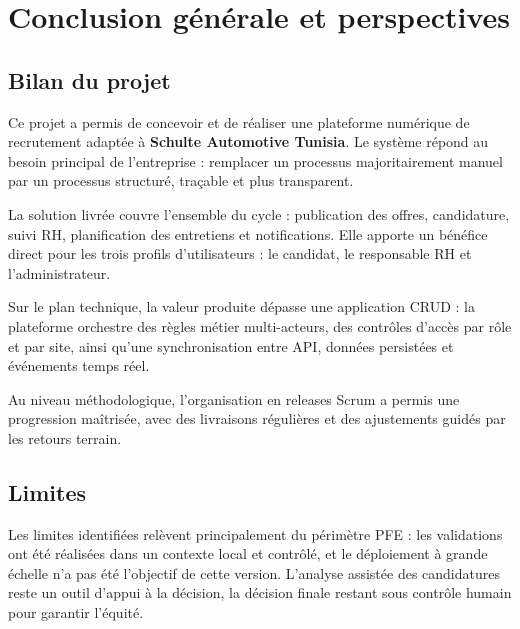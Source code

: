 
\chapter*{Conclusion générale et perspectives}

\section*{Bilan du projet}

Ce projet a permis de concevoir et de réaliser une plateforme numérique de
recrutement adaptée à \textbf{Schulte Automotive Tunisia}. Le système
répond au besoin principal de l'entreprise : remplacer un processus
majoritairement manuel par un processus structuré, traçable et plus
transparent.

La solution livrée couvre l'ensemble du cycle : publication des offres,
candidature, suivi RH, planification des entretiens et notifications.
Elle apporte un bénéfice direct pour les trois profils d'utilisateurs :
le candidat, le responsable RH et l'administrateur.

Sur le plan technique, la valeur produite dépasse une application CRUD :
la plateforme orchestre des règles métier multi-acteurs, des contrôles
d'accès par rôle et par site, ainsi qu'une synchronisation entre API,
données persistées et événements temps réel.

Au niveau méthodologique, l'organisation en releases Scrum a permis une
progression maîtrisée, avec des livraisons régulières et des ajustements
guidés par les retours terrain.

\section*{Limites}

Les limites identifiées relèvent principalement du périmètre PFE :
les validations ont été réalisées dans un contexte local et contrôlé, et
le déploiement à grande échelle n'a pas été l'objectif de cette version.
L'analyse assistée des candidatures reste un outil d'appui à la décision,
la décision finale restant sous contrôle humain pour garantir l'équité.

